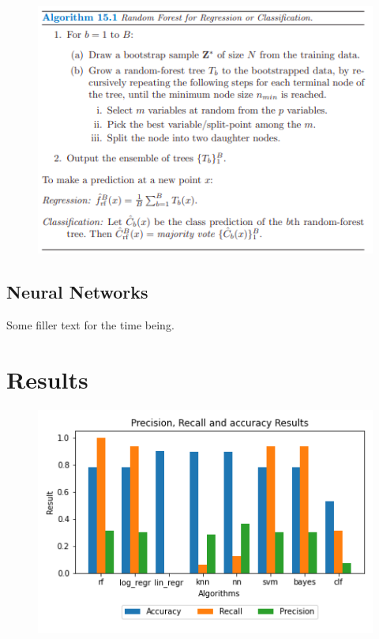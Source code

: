\documentclass[a4paper,12pt]{report}
\begin{document}
\enlargethispage{3\baselineskip}
\begin{figure}[h]
    \includegraphics[scale=0.7]{random_forest.png}
    \centering
    \label{fig:RF}
\end{figure}


\subsection{Neural Networks}
Some filler text for the time being.

\section{Results}

\begin{figure}[H]
    \includegraphics[scale=0.95]{results.png}
    \centering
    \label{fig:RF}
\end{figure}
\end{document}
